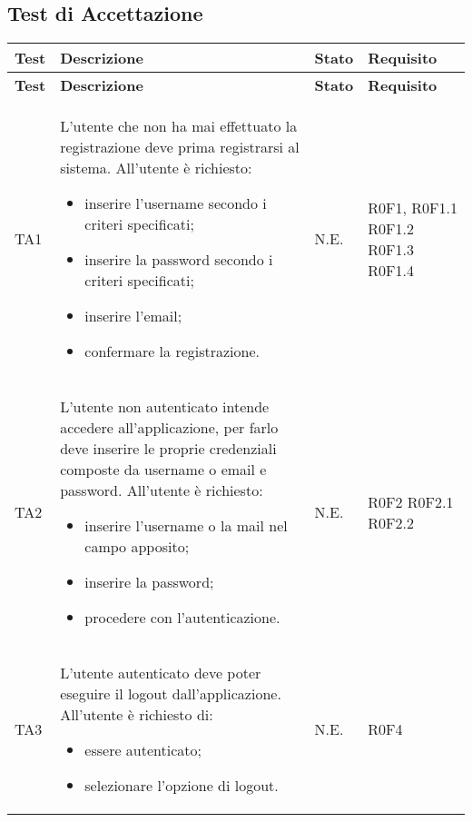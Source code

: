 \newpage
\subsection{Test di Accettazione}
\begin{longtable}{p{2cm}!{\VRule[1pt]}p{7.5cm}!{\VRule[1pt]}p{1cm}!{\VRule[1pt]}p{2.5cm}}
\color{white} \textbf{Test} & \color{white} \textbf{Descrizione}  & \color{white} \textbf{Stato}  & \color{white} \textbf{Requisito}\\ 
\endfirsthead 
{} 
\color{white} \textbf{Test} & \color{white} \textbf{Descrizione}  & \color{white} \textbf{Stato}  & \color{white} \textbf{Requisito}\\  
\endhead 
TA1 & L'utente che non ha mai effettuato la registrazione deve prima registrarsi al sistema. All'utente è richiesto: \begin{itemize}
\item inserire l'username secondo i criteri specificati;
\item inserire la password secondo i criteri specificati;
\item inserire l'email;
\item confermare la registrazione.
\end{itemize} & N.E. & R0F1, R0F1.1 \newline R0F1.2 R0F1.3 \newline R0F1.4\\

TA2 & L'utente non autenticato intende accedere all'applicazione, per farlo deve inserire le proprie credenziali composte da username o email e password. All'utente è richiesto: \begin{itemize}
\item inserire l'username o la mail nel campo apposito;
\item inserire la password;
\item procedere con l'autenticazione.
\end{itemize} & N.E. & R0F2 R0F2.1 \newline R0F2.2\\

TA3 & L'utente autenticato deve poter eseguire il logout dall'applicazione. All'utente è richiesto di:\begin{itemize}
\item essere autenticato;
\item selezionare l'opzione di logout.
\end{itemize} & N.E. & R0F4\\


\end{longtable}
